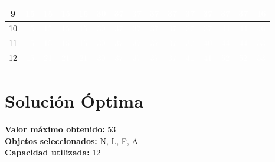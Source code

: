 \documentclass{article}
\begin{document}
\begin{center}
\begin{tabular}{|c|c|c|c|c|c|c|c|c|c|c|c|c|c|c|}
9 & \cellcolor{verde}\textcolor{white}{15} & \cellcolor{rojo}\textcolor{white}{15} & \cellcolor{rojo}\textcolor{white}{15} & \cellcolor{rojo}\textcolor{white}{15} & \cellcolor{verde}\textcolor{white}{30} & \cellcolor{verde}\textcolor{white}{37} & \cellcolor{rojo}\textcolor{white}{37} & \cellcolor{rojo}\textcolor{white}{37} & \cellcolor{rojo}\textcolor{white}{37} & \cellcolor{rojo}\textcolor{white}{37} & \cellcolor{rojo}\textcolor{white}{37} & \cellcolor{rojo}\textcolor{white}{37} & \cellcolor{rojo}\textcolor{white}{37} & \cellcolor{verde}\textcolor{white}{46} \\ \hline
10 & \cellcolor{verde}\textcolor{white}{15} & \cellcolor{rojo}\textcolor{white}{15} & \cellcolor{rojo}\textcolor{white}{15} & \cellcolor{rojo}\textcolor{white}{15} & \cellcolor{verde}\textcolor{white}{30} & \cellcolor{verde}\textcolor{white}{37} & \cellcolor{rojo}\textcolor{white}{37} & \cellcolor{rojo}\textcolor{white}{37} & \cellcolor{rojo}\textcolor{white}{37} & \cellcolor{rojo}\textcolor{white}{37} & \cellcolor{rojo}\textcolor{white}{37} & \cellcolor{verde}\textcolor{white}{44} & \cellcolor{rojo}\textcolor{white}{44} & \cellcolor{verde}\textcolor{white}{46} \\ \hline
11 & \cellcolor{verde}\textcolor{white}{15} & \cellcolor{rojo}\textcolor{white}{15} & \cellcolor{rojo}\textcolor{white}{15} & \cellcolor{rojo}\textcolor{white}{15} & \cellcolor{verde}\textcolor{white}{30} & \cellcolor{verde}\textcolor{white}{37} & \cellcolor{rojo}\textcolor{white}{37} & \cellcolor{rojo}\textcolor{white}{37} & \cellcolor{rojo}\textcolor{white}{37} & \cellcolor{rojo}\textcolor{white}{37} & \cellcolor{verde}\textcolor{white}{40} & \cellcolor{verde}\textcolor{white}{44} & \cellcolor{rojo}\textcolor{white}{44} & \cellcolor{verde}\textcolor{white}{53} \\ \hline
12 & \cellcolor{verde}\textcolor{white}{15} & \cellcolor{verde}\textcolor{white}{21} & \cellcolor{rojo}\textcolor{white}{21} & \cellcolor{rojo}\textcolor{white}{21} & \cellcolor{verde}\textcolor{white}{30} & \cellcolor{verde}\textcolor{white}{37} & \cellcolor{rojo}\textcolor{white}{37} & \cellcolor{rojo}\textcolor{white}{37} & \cellcolor{rojo}\textcolor{white}{37} & \cellcolor{verde}\textcolor{white}{41} & \cellcolor{rojo}\textcolor{white}{41} & \cellcolor{verde}\textcolor{white}{52} & \cellcolor{rojo}\textcolor{white}{52} & \cellcolor{verde}\textcolor{white}{53} \\ \hline
\end{tabular}
\end{center}
\normalsize

\section*{Solución Óptima}
\textbf{Valor máximo obtenido:} 53\\
\textbf{Objetos seleccionados:} N, L, F, A\\
\textbf{Capacidad utilizada:} 12\\
\end{document}
